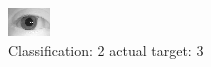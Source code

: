 \begin{figure}[h!]
\begin{center}
\includegraphics[width=0.60\columnwidth]{figures/ID1035_class_2_target_3.png}
\end{center}
\caption{ Classification: 2 actual target: 3}
\label{fig:ID1035_class_2_target_3}
\end{figure}
